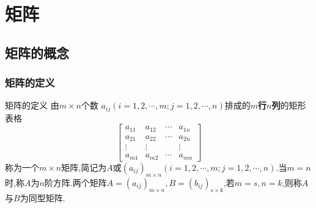 \documentclass[8pt a4paper,oneside,UTF8]{ctexbook}
\begin{document}
\begin{sloppypar}
    \else
    \fi
    \chapter{矩阵}
    \section{矩阵的概念}
    \subsection{矩阵的定义}
    \begin{defn}{矩阵的定义}{}
        由$m \times n$个数 $a_{ij}(i=1,2,\cdots,m;j=1,2,\cdots,n)$排成的\textbf{$m$行$n$列}的矩形表格
        $$
            \begin{bmatrix}
                a_{11} & a_{12} & \cdots & a_{1n} \\a_{21}&a_{22}&\cdots&a_{2n}\\\vdots&\vdots&&\vdots\\a_{m1}&a_{m2}&\cdots&a_{mn}
            \end{bmatrix}
        $$
        称为一个$m \times n$矩阵,简记为$A$或$(a_{ij})_{m\times n}(i=1,2,\cdots,m;j=1,2,\cdots,n).$当$m=n$时,称$A$为$n$阶方阵.两个矩阵$A=(a_{ij})_{m \times n},B=(b_{ij})_{s \times k}$,若$m=s,n=k$,则称$A$与$B$为同型矩阵.
    \end{defn}

\end{sloppypar}
\end{document}
